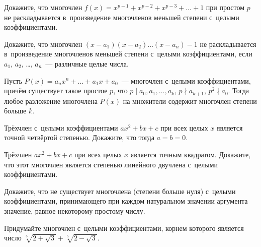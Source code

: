 


\begin{problems}

\item
Докажите, что многочлен $f(x) = x^{p-1} + x^{p-2} + x^{p-3} + \ldots + 1$ при
простом $p$ не раскладывается в~произведение многочленов меньшей степени
с~целыми коэффициентами.

\item
Докажите, что многочлен $(x - a_{1}) (x - a_{2}) \ldots (x - a_{n}) - 1$
не раскладывается в~произведение многочленов меньшей степени с~целыми
коэффициентами, если $a_{1}$, $a_{2}$, \ldots, $a_{n}$~--- различные целые
числа.

\item
Пусть $P(x) = a_{n} x^{n} + \ldots + a_{1} x + a_{0}$~--- многочлен с~целыми
коэффициентами, причём существует такое простое $p$, что\enspace
$p \mid a_{0}, a_{1}, \ldots, a_{k}$,\enspace
$p \nmid a_{k+1}$,\enspace
$p^2 \nmid a_{0}$.
Тогда любое разложение многочлена $P(x)$ на множители содержит многочлен
степени больше $k$.

\item
Трёхчлен с~целыми коэффициентами $a x^{2} + b x + c$ при всех целых $x$
является точной четвёртой степенью.
Докажите, что тогда $a = b = 0$.

\item
Трёхчлен $a x^{2} + b x + c$ при всех целых $x$ является точным квадратом.
Докажите, что этот многочлен является степенью линейного двучлена с~целыми
коэффициентами.

\item
Докажите, что не существует многочлена (степени больше нуля) с~целыми
коэффициентами, принимающего при каждом натуральном значении аргумента
значение, равное некоторому простому числу.

\item
Придумайте многочлен с~целыми коэффициентами, корнем которого является число
$\sqrt[5]{2 + \sqrt{3}} + \sqrt[5]{2 - \sqrt{3}}$.

\end{problems}


